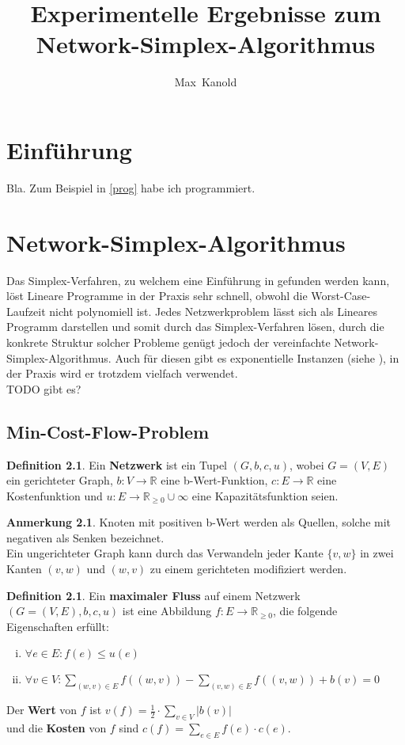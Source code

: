 \documentclass[a4paper,twoside,ngerman]{report}
\author{Max~Kanold}
\title{Experimentelle Ergebnisse zum Network-Simplex-Algorithmus}
\theoremstyle{plain}
\theoremstyle{definition}
\newtheorem{defn}[thm]{Definition}
\newtheorem*{anm}{Anmerkung}
\begin{document}
\maketitle
\tableofcontents

\newpage
\chapter{Einführung}
Bla. Zum Beispiel in \cref{prog} habe ich programmiert.

\newpage
\chapter{Network-Simplex-Algorithmus}
Das Simplex-Verfahren, zu welchem eine Einführung in \cite{NSAbook} gefunden werden kann, löst Lineare Programme in der Praxis sehr schnell, obwohl die Worst-Case-Laufzeit nicht polynomiell ist. Jedes Netzwerkproblem lässt sich als Lineares Programm darstellen und somit durch das Simplex-Verfahren lösen, durch die konkrete Struktur solcher Probleme genügt jedoch der vereinfachte Network-Simplex-Algorithmus. Auch für diesen gibt es exponentielle Instanzen (siehe \cite{Exponential}), in der Praxis wird er trotzdem vielfach verwendet.\\
TODO gibt es?

\section{Min-Cost-Flow-Problem}
\begin{defn}Ein \textbf{Netzwerk} ist ein Tupel $(G,b,c,u)$, wobei $G = (V,E)$ ein gerichteter Graph, $b : V\rightarrow\mathbb{R}$ eine b-Wert-Funktion, $c : E\rightarrow\mathbb{R}$ eine Kostenfunktion und $u : E\rightarrow\mathbb{R}_{\geq 0}\cup \infty$ eine Kapazitätsfunktion seien.\end{defn}
\begin{anm}Knoten mit positiven b-Wert werden als Quellen, solche mit negativen als Senken bezeichnet.\\
Ein ungerichteter Graph kann durch das Verwandeln jeder Kante $\{v,w\}$ in zwei Kanten $(v,w)$ und $(w,v)$ zu einem gerichteten modifiziert werden.\end{anm}

\begin{defn}\label{DefMaxFlow}Ein \textbf{maximaler Fluss} auf einem Netzwerk $(G=(V,E),b,c,u)$ ist eine Abbildung $f : E\rightarrow\mathbb{R}_{\geq 0}$, die folgende Eigenschaften erfüllt:
\begin{enumerate}[(i)]
\item $\forall e\in E : f(e)\leq u(e) $
\item $\forall v\in V : \sum_{(w,v)\in E} f((w,v)) - \sum_{(v,w)\in E} f((v,w)) + b(v) = 0$\label{DefMaxFlowII}
\end{enumerate}
Der \textbf{Wert} von $f$ ist
$v(f) = \frac{1}{2}\cdot\sum_{v\in V} |b(v)|$\\
und die \textbf{Kosten} von $f$ sind
$c(f) = \sum_{e\in E} f(e)\cdot c(e)$.
\end{defn}
\end{document}
